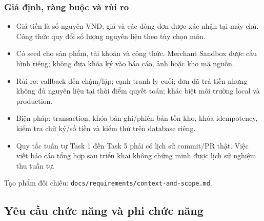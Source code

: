 \documentclass[12pt,a4paper]{article}
\newcommand{\tep}[1]{\nolinkurl{#1}}
\begin{document}
\subsubsection{Giả định, ràng buộc và rủi ro}
\begin{itemize}
\item Giá tiền là số nguyên VND; giá và các dòng đơn được xác nhận tại máy chủ. Công thức quy đổi số lượng nguyên liệu theo tùy chọn món.
\item Có seed cho sản phẩm, tài khoản và công thức. Merchant Sandbox được cấu hình riêng; không đưa khóa ký vào báo cáo, ảnh hoặc kho mã nguồn.
\item Rủi ro: callback đến chậm/lặp; cạnh tranh ly cuối; đơn đã trả tiền nhưng không đủ nguyên liệu tại thời điểm quyết toán; khác biệt môi trường local và production.
\item Biện pháp: transaction, khóa bản ghi/phiên bản tồn kho, khóa idempotency, kiểm tra chữ ký/số tiền và kiểm thử trên database riêng.
\item Quy tắc tuần tự Task 1 đến Task 5 phải có lịch sử commit/PR thật. Việc viết báo cáo tổng hợp sau triển khai không chứng minh được lịch sử nghiệm thu tuần tự.
\end{itemize}
Tạo phẩm đối chiếu: \tep{docs/requirements/context-and-scope.md}.

\subsection{Yêu cầu chức năng và phi chức năng}
\end{document}
